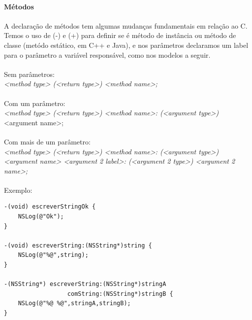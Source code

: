\documentclass[a4paper,12pt,brazil,doubleside]{book}
\begin{document}
\paragraph{}\textbf{Métodos}

\paragraph{}A declaração de métodos tem algumas mudanças fundamentais em relação ao C. Temos o uso de (-) e (+) para definir se é método de instância ou método de classe (metódo estático, em C++ e Java), e nos parâmetros declaramos um label para o parâmetro a variável responsável, como nos modelos a seguir.\\

\paragraph{}Sem parâmetros:\\
\emph{<method type> (<return type>) <method name>;}\\

\paragraph{}Com um parâmetro:\\
\emph{<method type> (<return type>) <method name>: (<argument type>)} <argument name>;\\

\paragraph{}Com mais de um parâmetro:\\
\emph{<method type> (<return type>) <method name>: (<argument type>) <argument name> <argument 2 label>: (<argument 2 type>) <argument 2 name>;}\\

\paragraph{}Exemplo:

\begin{listing}
\begin{verbatim}
-(void) escreverStringOk {
	NSLog(@"Ok");
}

-(void) escreverString:(NSString*)string {
	NSLog(@"%@",string);
}

-(NSString*) escreverString:(NSString*)stringA
                  comString:(NSString*)stringB {
	NSLog(@"%@ %@",stringA,stringB);
}
\end{verbatim}
\end{listing}
\end{document}

